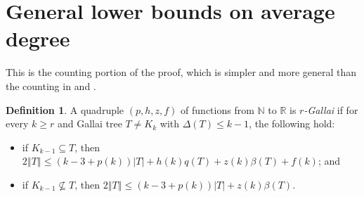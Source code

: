 \documentclass[10pt]{article}
\theoremstyle{plain}
\theoremstyle{definition}
\newtheorem{defn}{Definition}
\theoremstyle{remark}
\newcommand{\IN}{\mathbb{N}}
\newcommand{\IR}{\mathbb{R}}
\newcommand{\card}[1]{\left|#1\right|}
\newcommand{\size}[1]{\left\Vert#1\right\Vert}
\newcommand{\parens}[1]{\left( #1 \right)}
\begin{document}
\section{General lower bounds on average degree}
This is the counting portion of the proof, which is simpler and more general than the counting in \cite{OreVizing} and \cite{DischargingLowerBound}.
\begin{defn}
A quadruple $\parens{p,h,z,f}$ of functions from $\IN$ to $\IR$ is \emph{$r$-Gallai} if for every $k \ge r$ and Gallai tree $T \ne K_k$ with $\Delta(T) \le k-1$,
the following hold:
\begin{itemize}
\item if $K_{k-1} \subseteq T$, then $2\size{T} \le \parens{k-3 + p(k)}\card{T} + h(k)q(T) + z(k)\beta(T) + f(k)$; and
\item if $K_{k-1} \not\subseteq T$, then $2\size{T} \le \parens{k-3 + p(k)}\card{T} + z(k)\beta(T)$.
\end{itemize}
\end{defn}
\end{document}
